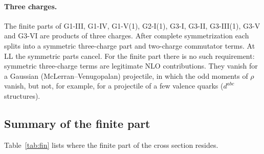 \documentclass[aps,prd,onecolumn,superscriptaddress,nofootinbib,floatfix,longbibliography,11pt]{revtex4-2}
\numberwithin{equation}{section}
\begin{document}
\paragraph*{Three charges.} The finite parts of G1-III, G1-IV, G1-V(1), G2-I(1), G3-I, G3-II, G3-III(1), G3-V and G3-VI are products of three charges. After complete symmetrization each splits into a symmetric three-charge part and two-charge commutator terms. At LL the symmetric parts cancel. For the finite part there is no such requirement: symmetric three-charge terms are legitimate NLO contributions. They vanish for a Gaussian (McLerran--Venugopalan) projectile, in which the odd moments of $\rho$ vanish, but not, for example, for a projectile of a few valence quarks ($d^{abc}$ structures).

\subsection{Summary of the finite part}\label{sec:finsum}

Table~\ref{tab:fin} lists where the finite part of the cross section resides.
\end{document}
